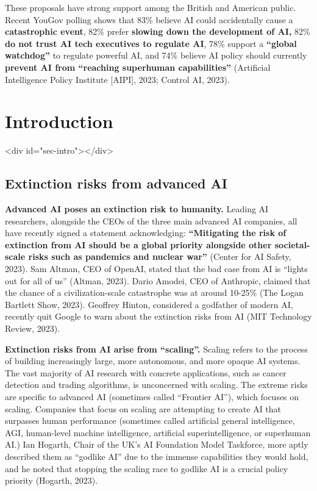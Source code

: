 \documentclass[12pt,a4paper]{article}
\begin{document}
These proposals have strong support among the British and American public. Recent YouGov polling shows that 83\% believe AI could accidentally cause a \textbf{catastrophic event}, 82\% prefer \textbf{slowing down the development of AI,} 82\% \textbf{do not trust AI tech executives to regulate AI}, 78\% support a \textbf{“global watchdog”} to regulate powerful AI, and 74\% believe AI policy should currently \textbf{prevent AI from “reaching superhuman capabilities”} (Artificial Intelligence Policy Institute [AIPI], 2023; Control AI, 2023).


\newpage
\section{Introduction}<div id="sec-intro"></div>

\subsection{Extinction risks from advanced AI} 
\textbf{Advanced AI poses an extinction risk to humanity.} Leading AI researchers, alongside the CEOs of the three main advanced AI companies, all have recently signed a statement acknowledging: \textbf{“Mitigating the risk of extinction from AI should be a global priority alongside other societal-scale risks such as pandemics and nuclear war”} (Center for AI Safety, 2023). Sam Altman, CEO of OpenAI, stated that the bad case from AI is “lights out for all of us” (Altman, 2023). Dario Amodei, CEO of Anthropic, claimed that the chance of a civilization-scale catastrophe was at around 10-25\% (The Logan Bartlett Show, 2023). Geoffrey Hinton, considered a godfather of modern AI, recently quit Google to warn about the extinction risks from AI (MIT Technology Review, 2023). 

\textbf{Extinction risks from AI arise from “scaling”.} Scaling refers to the process of building increasingly large, more autonomous, and more opaque AI systems. The vast majority of AI research with concrete applications, such as cancer detection and trading algorithms, is unconcerned with scaling. The extreme risks are specific to advanced AI (sometimes called “Frontier AI”), which focuses on scaling. Companies that focus on scaling are attempting to create AI that surpasses human performance (sometimes called artificial general intelligence, AGI, human-level machine intelligence, artificial superintelligence, or superhuman AI.) Ian Hogarth, Chair of the UK’s AI Foundation Model Taskforce, more aptly described them as “godlike AI” due to the immense capabilities they would hold, and he noted that stopping the scaling race to godlike AI is a crucial policy priority (Hogarth, 2023).
\end{document}
